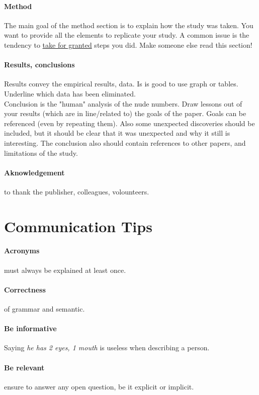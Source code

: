 \documentclass{article}
\begin{document}
\paragraph{Method} The main goal of the method section is to explain how the study was taken. You want to provide all the elements to replicate your study. A common issue is the tendency to \underline{take for granted} steps you did. Make someone else read this section!
\paragraph{Results, conclusions} Results convey the empirical results, data. Is is good to use graph or tables. Underline which data has been eliminated.\\ 
Conclusion is the "human" analysis of the nude numbers. Draw lessons out of your results (which are in line/related to) the goals of the paper. Goals can be referenced (even by repeating them). Also some unexpected discoveries should be included, but it should be clear that it was unexpected and why it still is interesting. The conclusion also should contain references to other papers, and limitations of the study.
\paragraph{Aknowledgement} to thank the publisher, colleagues, volounteers.



\appendix
\section{Communication Tips}
\paragraph{Acronyms} must always be explained at least once.
\paragraph{Correctness} of grammar and semantic.
\paragraph{Be informative} Saying \textit{he has 2 eyes, 1 mouth} is useless when describing a person.
\paragraph{Be relevant} ensure to answer any open question, be it explicit or implicit.
\end{document}
